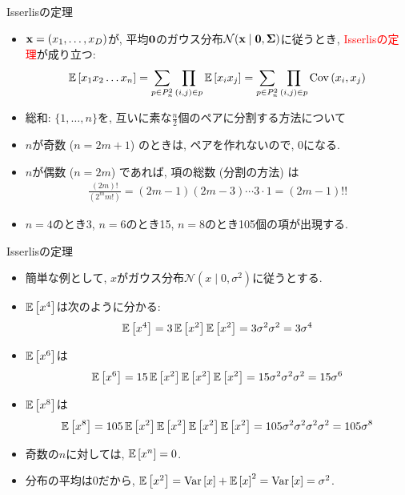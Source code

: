 \documentclass[dvipdfmx,notheorems,t]{beamer}
\begin{document}
\begin{frame}{Isserlisの定理}
\begin{itemize}
  \item $\vb{x} = (x_1, \ldots, x_D)$が, 平均$\vb{0}$のガウス分布$\mathcal{N}(\vb{x} \mid \vb{0}, \vb{\Sigma})$に従うとき,
  \textcolor{red}{Isserlisの定理}が成り立つ:
  \begin{align*}
    \E{x_1 x_2 \ldots x_n} = \sum_{p \in P_n^2} \prod_{(i, j) \in p} \E{x_i x_j}
      = \sum_{p \in P_n^2} \prod_{(i, j) \in p} \Cov{x_i}{x_j}
  \end{align*}
  \item 総和: $\{ 1, \ldots, n \}$を, 互いに素な$\frac{n}{2}$個のペアに分割する方法について
  \item $n$が奇数 ($n = 2m + 1$) のときは, ペアを作れないので, 0になる.
  \item $n$が偶数 ($n = 2m$) であれば, 項の総数 (分割の方法) は
  \begin{align*}
    \frac{(2m)!}{(2^m m!)} = (2m - 1) (2m - 3) \cdots 3 \cdot 1 = (2m - 1)!!
  \end{align*}
  \item $n = 4$のとき3, $n = 6$のとき15, $n = 8$のとき105個の項が出現する.
\end{itemize}
\end{frame}

\begin{frame}{Isserlisの定理}
\begin{itemize}
  \item 簡単な例として, $x$がガウス分布$\mathcal{N}(x \mid 0, \sigma^2)$に従うとする.
  \item $\E{x^4}$は次のように分かる:
  \begin{align*}
    \E{x^4} = 3 \E{x^2} \E{x^2} = 3 \sigma^2 \sigma^2 = 3 \sigma^4
  \end{align*}
  \item $\E{x^6}$は
  \begin{align*}
    \E{x^6} = 15 \E{x^2} \E{x^2} \E{x^2} = 15 \sigma^2 \sigma^2 \sigma^2 = 15 \sigma^6
  \end{align*}
  \item $\E{x^8}$は
  \begin{align*}
    \E{x^8} = 105 \E{x^2} \E{x^2} \E{x^2} \E{x^2} = 105 \sigma^2 \sigma^2 \sigma^2 \sigma^2 = 105 \sigma^8
  \end{align*}
  \item 奇数の$n$に対しては, $\E{x^n} = 0$.
  \item 分布の平均は0だから, $\E{x^2} = \Var{x} + \E{x}^2 = \Var{x} = \sigma^2$.
\end{itemize}
\end{frame}
\end{document}
